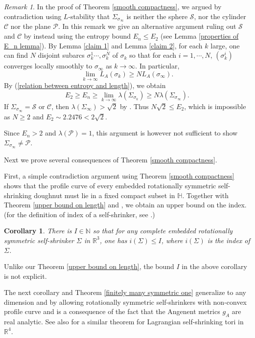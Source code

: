 \documentclass[12pt]{amsart}
\numberwithin{equation}{section}
\newtheorem{cor}[thm]{Corollary}
\theoremstyle{remark}
\newtheorem{rem}{Remark}[section]
\begin{document}
	\begin{rem}
		In the proof of Theorem \ref{smooth compactness}, we argued by contradiction using $L$-stability that $\Sigma_{\sigma_{\infty}}$ is neither the sphere $\mathcal S$, nor the cylinder $\mathcal C$ nor the plane $\mathcal P$. In this remark we give an alternative argument ruling out $\mathcal S$ and $\mathcal C$ by instead using the entropy bound $E_n \le E_2$ (see Lemma \ref{properties of E_n lemma}). By Lemma \ref{claim 1} and Lemma \ref{claim 2}, for each $k$ large, one can find $N$ disjoint subarcs $\sigma_k^1 \cdots, \sigma_k^N$ of $\sigma_k $ so that for each $i=1, \cdots, N$, $(\sigma_k ^i)$ converges locally smoothly to $\sigma_\infty$ as $k\to \infty$. In particular, 
		$$ \lim_{k\to \infty} L_A (\sigma_k) \ge N L_A(\sigma_\infty).$$
		By (\ref{relation between entropy and length}), we obtain 
		$$ E_2 \ge E_n \ge \lim_{k\to \infty} \lambda (\Sigma_{\sigma_k}) \ge N \lambda (\Sigma_{\sigma_\infty}). $$
		If $\Sigma_{\sigma_\infty} = \mathcal S$ or $\mathcal C$, then $\lambda (\Sigma_\infty) > \sqrt 2$ by \cite[A.4 Lemma]{Stone}. Thus $N\sqrt 2 \le E_2$, which is impossible as $N \ge 2$ and $E_2 \sim 2.2476< 2\sqrt 2$. 
		
		Since $E_n >2$ and $\lambda (\mathcal P)=1$, this argument is however not sufficient to show $\Sigma_{\sigma_\infty} \neq \mathcal P$. 
	\end{rem}
	
	
	Next we prove several consequences of Theorem \ref{smooth compactness}.
	
	First, a simple contradiction argument using Theorem \ref{smooth compactness} shows that the profile curve of every embedded rotationally symmetric self-shrinking doughnut must lie in a fixed compact subset in $\mathbb H$. Together with Theorem \ref{upper bound on length} and \cite[Theorem 1.1]{yakov2}, we obtain an upper bound on the index. (for the definition of index of a self-shrinker, see \cite[Definition 2.18]{yakov2}.) 
	
	\begin{cor} \label{cor index upper bound}
		There is $I\in \mathbb N$ so that for any complete embedded rotationally symmetric self-shrinker $\Sigma$ in $\mathbb R^3$, one has $i(\Sigma)\le I$, where $i(\Sigma)$ is the index of $\Sigma$. 
	\end{cor}
	
	Unlike our Theorem \ref{upper bound on length}, the bound $I$ in the above corollary is not explicit. 
	
	The next corollary and Theorem \ref{finitely many symmetric one} generalize \cite[Theorem 1.3]{Alex} to any dimension and by allowing rotationally symmetric self-shrinkers with non-convex profile curve and is a consequence of the fact that the Angenent metrics $g_A$ are real analytic. See also \cite{ChenMa2} for a similar theorem for Lagrangian self-shrinking tori in $\mathbb R^4$.
	
\end{document}

